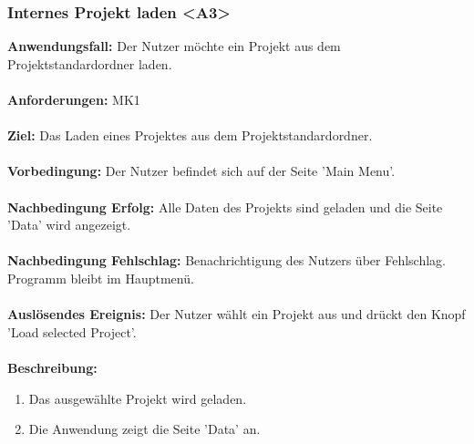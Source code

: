 \documentclass[parskip=full]{scrartcl} %
\begin{document}
\subsubsection*{Internes Projekt laden <A3>}
\textbf{Anwendungsfall:} Der Nutzer möchte ein Projekt aus dem Projektstandardordner laden.\\\\
\textbf{Anforderungen:} MK1 \\\\
\textbf{Ziel:} Das Laden eines Projektes aus dem Projektstandardordner. \\\\
\textbf{Vorbedingung:} Der Nutzer befindet sich auf der Seite 'Main Menu'.  \\\\
\textbf{Nachbedingung Erfolg:} Alle Daten des Projekts sind geladen und die Seite 'Data' wird angezeigt. \\\\
\textbf{Nachbedingung Fehlschlag:} Benachrichtigung des Nutzers über Fehlschlag. Programm  bleibt im Hauptmenü. \\\\
\textbf{Auslösendes Ereignis:}  Der Nutzer wählt ein Projekt aus und drückt den Knopf 'Load selected Project'. \\\\
\textbf{Beschreibung:}
\begin{enumerate}
    \item Das ausgewählte Projekt wird geladen.
    \item Die Anwendung zeigt die Seite 'Data' an.
\end{enumerate}
\newpage
\end{document}
